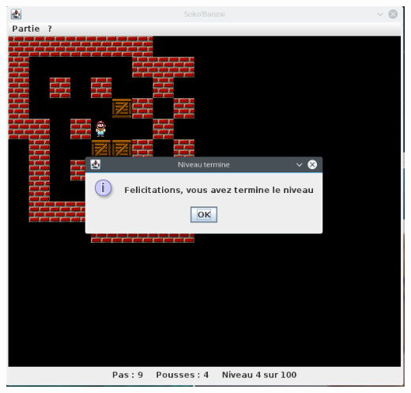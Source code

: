 \documentclass[a4paper,12pt]{article} %
\begin{document}
\begin{center} \includegraphics[scale=0.7]{interface1.png} \end{center}
\newpage
\end{document}
